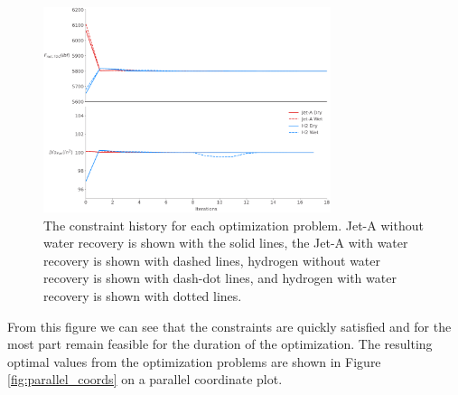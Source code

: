 \documentclass[conf]{new-aiaa}
\begin{document}
\begin{figure}[hbt!]
    \centering
    \includegraphics[width=0.75\textwidth]{cons.pdf}
    \caption{The constraint history for each optimization problem.
        Jet-A without water recovery is shown with the solid lines, the Jet-A with water recovery is shown with dashed lines, hydrogen without water recovery is shown with dash-dot lines, and hydrogen with water recovery is shown with dotted lines.}
    \label{fig:history_cons}
\end{figure}

From this figure we can see that the constraints are quickly satisfied and for the most part remain feasible for the duration of the optimization.
The resulting optimal values from the optimization problems are shown in Figure \ref{fig:parallel_coords} on a parallel coordinate plot.
\end{document}
